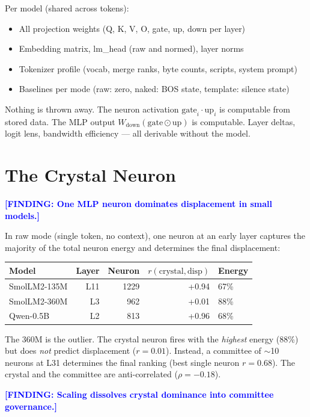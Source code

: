 \documentclass[11pt]{article}
\newcommand{\finding}[1]{\textcolor{blue}{\textbf{[FINDING: #1]}}}
\begin{document}
Per model (shared across tokens):
\begin{itemize}
\item All projection weights (Q, K, V, O, gate, up, down per layer)
\item Embedding matrix, lm\_head (raw and normed), layer norms
\item Tokenizer profile (vocab, merge ranks, byte counts, scripts, system prompt)
\item Baselines per mode (raw: zero, naked: BOS state, template: silence state)
\end{itemize}

Nothing is thrown away. The neuron activation $\text{gate}_i \cdot \text{up}_i$ is computable from stored data. The MLP output $W_{\text{down}} (\text{gate} \odot \text{up})$ is computable. Layer deltas, logit lens, bandwidth efficiency --- all derivable without the model.

\section{The Crystal Neuron}

\finding{One MLP neuron dominates displacement in small models.}

In raw mode (single token, no context), one neuron at an early layer captures the majority of the total neuron energy and determines the final displacement:

\begin{center}
\begin{tabular}{lrrrl}
\toprule
Model & Layer & Neuron & $r(\text{crystal}, \text{disp})$ & Energy \\
\midrule
SmolLM2-135M & L11 & 1229 & +0.94 & 67\% \\
SmolLM2-360M & L3 & 962 & +0.01 & 88\% \\
Qwen-0.5B & L2 & 813 & +0.96 & 68\% \\
\bottomrule
\end{tabular}
\end{center}

The 360M is the outlier. The crystal neuron fires with the \emph{highest} energy (88\%) but does \emph{not} predict displacement ($r = 0.01$). Instead, a committee of $\sim$10 neurons at L31 determines the final ranking (best single neuron $r = 0.68$). The crystal and the committee are anti-correlated ($\rho = -0.18$).

\finding{Scaling dissolves crystal dominance into committee governance.}
\end{document}
